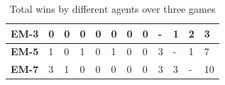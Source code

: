 \documentclass{svproc}
\begin{document}
\begin{table}[H]
{\begin{tabular}{|l|l|l|l|l|l|l|l|l|l|l|l|}
\textbf{EM-3} & 0               & 0                     & 0                     & 0                     & 0                  & 0                  & 0                  & -                     & 1                     & 2                     & 3                    \\ \hline
\textbf{EM-5} & 1               & 0                     & 1                     & 0                     & 1                  & 0                  & 0                  & 3                     & -                     & 1                     & 7                    \\ \hline
\textbf{EM-7} & 3               & 1                     & 0                     & 0                     & 0                  & 0                  & 0                  & 3                     & 3                     & -                     & 10                   \\ \hline
\end{tabular}%
}
\caption{Total wins by different agents over three games}
\label{table1}
\end{table}
\end{document}
